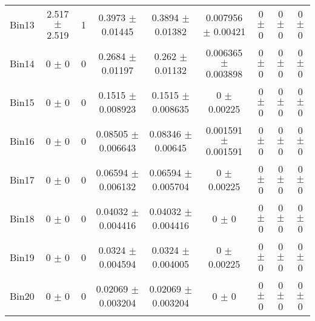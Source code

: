 \begin{tabular}{@{\extracolsep{4pt}}lcccccccc@{}}
     Bin13 & 2.517 $\pm$ 2.519 & 1 & 0.3973 $\pm$ 0.01445 & 0.3894 $\pm$ 0.01382 & 0.007956 $\pm$ 0.00421 & 0 $\pm$ 0 & 0 $\pm$ 0 & 0 $\pm$ 0 \\ 
     Bin14 & 0 $\pm$ 0 & 0 & 0.2684 $\pm$ 0.01197 & 0.262 $\pm$ 0.01132 & 0.006365 $\pm$ 0.003898 & 0 $\pm$ 0 & 0 $\pm$ 0 & 0 $\pm$ 0 \\ 
     Bin15 & 0 $\pm$ 0 & 0 & 0.1515 $\pm$ 0.008923 & 0.1515 $\pm$ 0.008635 & 0 $\pm$ 0.00225 & 0 $\pm$ 0 & 0 $\pm$ 0 & 0 $\pm$ 0 \\ 
     Bin16 & 0 $\pm$ 0 & 0 & 0.08505 $\pm$ 0.006643 & 0.08346 $\pm$ 0.00645 & 0.001591 $\pm$ 0.001591 & 0 $\pm$ 0 & 0 $\pm$ 0 & 0 $\pm$ 0 \\ 
     Bin17 & 0 $\pm$ 0 & 0 & 0.06594 $\pm$ 0.006132 & 0.06594 $\pm$ 0.005704 & 0 $\pm$ 0.00225 & 0 $\pm$ 0 & 0 $\pm$ 0 & 0 $\pm$ 0 \\ 
     Bin18 & 0 $\pm$ 0 & 0 & 0.04032 $\pm$ 0.004416 & 0.04032 $\pm$ 0.004416 & 0 $\pm$ 0 & 0 $\pm$ 0 & 0 $\pm$ 0 & 0 $\pm$ 0 \\ 
     Bin19 & 0 $\pm$ 0 & 0 & 0.0324 $\pm$ 0.004594 & 0.0324 $\pm$ 0.004005 & 0 $\pm$ 0.00225 & 0 $\pm$ 0 & 0 $\pm$ 0 & 0 $\pm$ 0 \\ 
     Bin20 & 0 $\pm$ 0 & 0 & 0.02069 $\pm$ 0.003204 & 0.02069 $\pm$ 0.003204 & 0 $\pm$ 0 & 0 $\pm$ 0 & 0 $\pm$ 0 & 0 $\pm$ 0 \\ 
\hline\hline
  \end{tabular}
